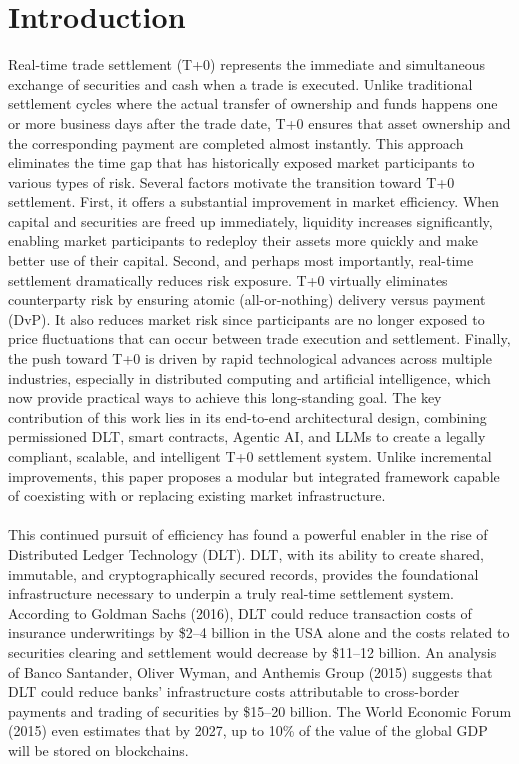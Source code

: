 \documentclass[conference]{IEEEtran}
\begin{document}
\section{Introduction}
Real-time trade settlement (T+0) represents the immediate and simultaneous exchange of securities and cash when a trade is executed. Unlike traditional settlement cycles where the actual transfer of ownership and funds happens one or more business days after the trade date, T+0 ensures that asset ownership and the corresponding payment are completed almost instantly. This approach eliminates the time gap that has historically exposed market participants to various types of risk.
Several factors motivate the transition toward T+0 settlement. First, it offers a substantial improvement in market efficiency. When capital and securities are freed up immediately, liquidity increases significantly, enabling market participants to redeploy their assets more quickly and make better use of their capital\cite{b1}. Second, and perhaps most importantly, real-time settlement dramatically reduces risk exposure\cite{b2}. T+0 virtually eliminates counterparty risk by ensuring atomic (all-or-nothing) delivery versus payment (DvP). It also reduces market risk since participants are no longer exposed to price fluctuations that can occur between trade execution and settlement. Finally, the push toward T+0 is driven by rapid technological advances across multiple industries, especially in distributed computing and artificial intelligence, which now provide practical ways to achieve this long-standing goal\cite{b1}. The key contribution of this work lies in its end-to-end architectural design, combining permissioned DLT, smart contracts, Agentic AI, and LLMs to create a legally compliant, scalable, and intelligent T+0 settlement system. Unlike incremental improvements, this paper proposes a modular but integrated framework capable of coexisting with or replacing existing market infrastructure.
\\\\
This continued pursuit of efficiency has found a powerful enabler in the rise of Distributed Ledger Technology (DLT). DLT, with its ability to create shared, immutable, and cryptographically secured records, provides the foundational infrastructure necessary to underpin a truly real-time settlement system. According to Goldman Sachs (2016), DLT could reduce transaction costs of insurance underwritings by \$2–4 billion in the USA alone and the costs related to securities clearing and settlement would decrease by \$11–12 billion. An analysis of Banco Santander, Oliver Wyman, and Anthemis Group (2015) suggests that DLT could reduce banks’ infrastructure costs attributable to cross-border payments and trading of securities by \$15–20 billion. The World Economic Forum (2015) even estimates that by 2027, up to 10\% of the value of the global GDP will be stored on blockchains\cite{b3}.
\end{document}
